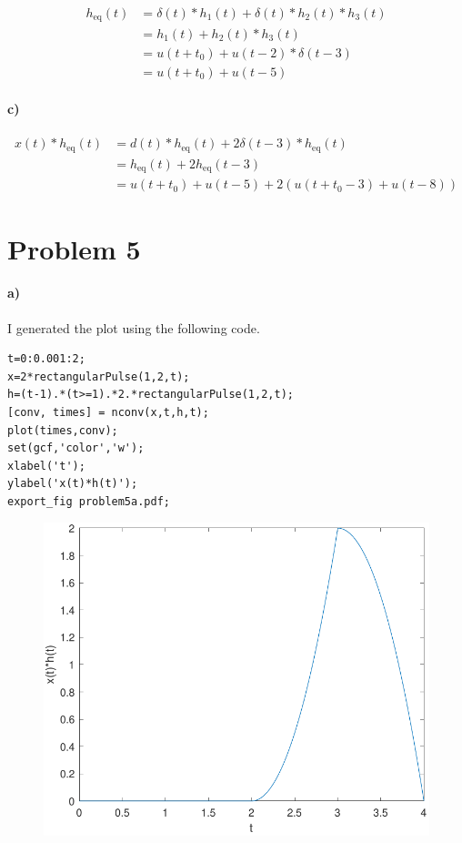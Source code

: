 \documentclass[12pt]{article}
\begin{document}
\begin{align*}
    h_{\text{eq}}(t)&=\delta(t)*h_1(t) + \delta(t)*h_2(t)*h_3(t)\\
    &=h_1(t)+h_2(t)*h_3(t)\\
    &=u(t+t_0)+u(t-2)*\delta(t-3)\\
    &=u(t+t_0)+u(t-5)
\end{align*}

\paragraph{c)}

\begin{align*}
    x(t)*h_{\text{eq}}(t)&=d(t)*h_{\text{eq}}(t)+2\delta(t-3)*h_{\text{eq}}(t)\\
    &=h_{\text{eq}}(t)+2h_{\text{eq}}(t-3)\\
    &=u(t+t_0)+u(t-5)+2(u(t+t_0-3)+u(t-8))
\end{align*}

\pagebreak

\section*{Problem 5}

\paragraph{a)}

I generated the plot using the following code.
\begin{verbatim}
t=0:0.001:2;
x=2*rectangularPulse(1,2,t);
h=(t-1).*(t>=1).*2.*rectangularPulse(1,2,t);
[conv, times] = nconv(x,t,h,t);
plot(times,conv);
set(gcf,'color','w');
xlabel('t');
ylabel('x(t)*h(t)');
export_fig problem5a.pdf;
\end{verbatim}
\begin{figure}[H]
    \begin{center}
        \includegraphics[width=4.5in]{problem5a.pdf}
    \end{center}
\end{figure}
\end{document}
